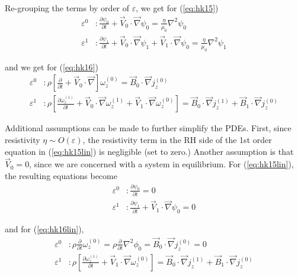 \documentclass{article}
\begin{document}
Re-grouping the terms by order of $\varepsilon$, we get for (\ref{eq:hk15})
\begin{equation}
    \label{eq:hk15lin}
    \begin{split}
        \varepsilon^0 &: \frac{\partial \psi_0}{\partial t} + \vec{V}_0 \cdot \vec{\nabla} \psi_0 = \frac{\eta}{\mu_0}\nabla ^{2}\psi_0 \\
        \varepsilon^1 &: \frac{\partial \psi_1}{\partial t} + \vec{V}_0 \cdot \vec{\nabla} \psi_1 + \vec{V}_1 \cdot \vec{\nabla} \psi_0 = \frac{\eta}{\mu_0}\nabla ^{2}\psi_1
    \end{split}
\end{equation}

and we get for (\ref{eq:hk16})
\begin{equation}
    \label{eq:hk16lin}
    \begin{split}
        \varepsilon^0 &: \rho\left[ \frac{\partial}{\partial t} + \vec{V}_0 \cdot \vec{\nabla} \right] \omega_z^{(0)} = \vec{B}_0 \cdot \vec{\nabla}j_z^{(0)} \\
        \varepsilon^1 &: \rho\left[\frac{\partial \omega_z^{(1)}}{\partial t} + \vec{V}_0 \cdot \vec{\nabla}\omega_z^{(1)} + \vec{V}_1 \cdot \vec{\nabla}\omega_z^{(0)}\right] = \vec{B}_0 \cdot \vec{\nabla}j_z^{(1)} + \vec{B}_1 \cdot \vec{\nabla}j_z^{(0)}
    \end{split}
\end{equation} 

Additional assumptions can be made to further simplify the PDEs. First, since resistivity $\eta\sim O(\varepsilon)$, the resistivity term in the RH side of the 1st order equation in (\ref{eq:hk15lin}) is negligible (set to zero.)
Another assumption is that $\vec{V}_0=0$, since we are concerned with a system in equilibrium. For (\ref{eq:hk15lin}), the resulting equations become
\begin{equation}
    \begin{split}
        \varepsilon^0 &: \frac{\partial \psi_0}{\partial t} = 0 \\
        \varepsilon^1 &: \frac{\partial \psi_1}{\partial t} + \vec{V}_1 \cdot \vec{\nabla} \psi_0 = 0
    \end{split}
\end{equation} 

and for (\ref{eq:hk16lin}),
\begin{equation}
    \begin{split}
        \varepsilon^0 &: \rho\frac{\partial}{\partial t}\omega_z^{(0)} = \rho\frac{\partial}{\partial t}\nabla ^{2} \phi_0 = \vec{B}_0 \cdot \vec{\nabla}j_z^{(0)} = 0 \\ 
                \varepsilon^1 &: \rho\left[\frac{\partial \omega_z^{(1)}}{\partial t} + \vec{V}_1 \cdot \vec{\nabla}\omega_z^{(0)}\right] = \vec{B}_0 \cdot \vec{\nabla}j_z^{(1)} + \vec{B}_1 \cdot \vec{\nabla}j_z^{(0)}
    \end{split}
\end{equation} 
\end{document}
